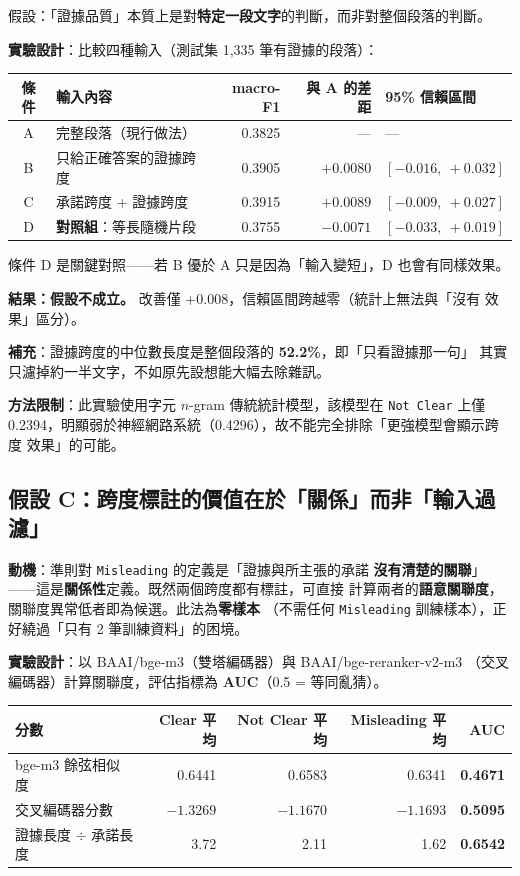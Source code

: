 \documentclass[11pt,a4paper]{ctexart}
\newcommand{\fieldname}[1]{\texttt{#1}}
\begin{document}
假設：「證據品質」本質上是對\textbf{特定一段文字}的判斷，而非對整個段落的判斷。

\textbf{實驗設計}：比較四種輸入（測試集 1{,}335 筆有證據的段落）：

\begin{table}[h]
\centering
\small
\begin{tabular}{@{}clrrl@{}}
\toprule
條件 & 輸入內容 & macro-F1 & 與 A 的差距 & 95\% 信賴區間 \\
\midrule
A & 完整段落（現行做法）        & 0.3825 & ---      & --- \\
B & 只給正確答案的證據跨度      & 0.3905 & $+0.0080$ & $[-0.016,\ +0.032]$ \\
C & 承諾跨度 + 證據跨度         & 0.3915 & $+0.0089$ & $[-0.009,\ +0.027]$ \\
D & \textbf{對照組}：等長隨機片段 & 0.3755 & $-0.0071$ & $[-0.033,\ +0.019]$ \\
\bottomrule
\end{tabular}
\end{table}

條件 D 是關鍵對照——若 B 優於 A 只是因為「輸入變短」，D 也會有同樣效果。

\textbf{結果：假設不成立。} 改善僅 $+0.008$，信賴區間跨越零（統計上無法與「沒有
效果」區分）。

\textbf{補充}：證據跨度的中位數長度是整個段落的 \textbf{52.2\%}，即「只看證據那一句」
其實只濾掉約一半文字，不如原先設想能大幅去除雜訊。

\textbf{方法限制}：此實驗使用字元 $n$-gram 傳統統計模型，該模型在 \fieldname{Not Clear}
上僅 0.2394，明顯弱於神經網路系統（0.4296），故不能完全排除「更強模型會顯示跨度
效果」的可能。

\subsection*{假設 C：跨度標註的價值在於「關係」而非「輸入過濾」}

\textbf{動機}：準則對 \fieldname{Misleading} 的定義是「證據與所主張的承諾
\textbf{沒有清楚的關聯}」——這是\textbf{關係性}定義。既然兩個跨度都有標註，可直接
計算兩者的\textbf{語意關聯度}，關聯度異常低者即為候選。此法為\textbf{零樣本}
（不需任何 \fieldname{Misleading} 訓練樣本），正好繞過「只有 2 筆訓練資料」的困境。

\textbf{實驗設計}：以 BAAI/bge-m3（雙塔編碼器）與 BAAI/bge-reranker-v2-m3
（交叉編碼器）計算關聯度，評估指標為 \textbf{AUC}（0.5 = 等同亂猜）。

\begin{table}[h]
\centering
\small
\begin{tabular}{@{}lrrrr@{}}
\toprule
分數 & Clear 平均 & Not Clear 平均 & Misleading 平均 & AUC \\
\midrule
bge-m3 餘弦相似度        & 0.6441 & 0.6583 & 0.6341 & \textbf{0.4671} \\
交叉編碼器分數           & $-1.3269$ & $-1.1670$ & $-1.1693$ & \textbf{0.5095} \\
證據長度 $\div$ 承諾長度 & 3.72 & 2.11 & 1.62 & \textbf{0.6542} \\
\bottomrule
\end{tabular}
\end{table}
\end{document}
